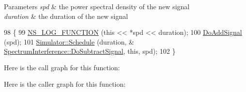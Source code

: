 \begin{DoxyParams}{Parameters}
{\em spd} & the power spectral density of the new signal \\
\hline
{\em duration} & the duration of the new signal \\
\hline
\end{DoxyParams}

\begin{DoxyCode}
98 \{
99   \hyperlink{log-macros-disabled_8h_a90b90d5bad1f39cb1b64923ea94c0761}{NS\_LOG\_FUNCTION} (\textcolor{keyword}{this} << *spd << duration);
100   \hyperlink{classns3_1_1SpectrumInterference_aa803e02fc1fa085c35657dbd821ef7eb}{DoAddSignal} (spd);
101   \hyperlink{classns3_1_1Simulator_a671882c894a08af4a5e91181bf1eec13}{Simulator::Schedule} (duration, &
      \hyperlink{classns3_1_1SpectrumInterference_a69d0a152b6e6a286489738ce3d623a12}{SpectrumInterference::DoSubtractSignal}, \textcolor{keyword}{this}, spd);
102 \}
\end{DoxyCode}


Here is the call graph for this function\+:




Here is the caller graph for this function\+:


